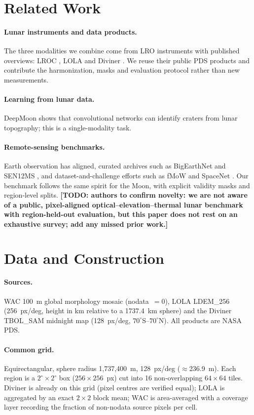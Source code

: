 \documentclass[10pt]{article}
\newcommand{\TODO}[1]{\textbf{[TODO: #1]}}
\begin{document}
\section{Related Work}
\paragraph{Lunar instruments and data products.}
The three modalities we combine come from LRO instruments with published
overviews: LROC \cite{robinson2010lroc}, LOLA \cite{smith2010lola,smith2017lola}
and Diviner \cite{paige2010diviner,williams2017diviner}. We reuse their public
PDS products and contribute the harmonization, masks and evaluation protocol
rather than new measurements.
\paragraph{Learning from lunar data.}
DeepMoon \cite{silburt2019deepmoon} shows that convolutional networks can
identify craters from lunar topography; this is a single-modality task.
\paragraph{Remote-sensing benchmarks.}
Earth observation has aligned, curated archives such as BigEarthNet
\cite{sumbul2019bigearthnet} and SEN12MS \cite{schmitt2019sen12ms}, and
dataset-and-challenge efforts such as fMoW \cite{christie2018fmow} and SpaceNet
\cite{vanetten2018spacenet}. Our benchmark follows the same spirit for the
Moon, with explicit validity masks and region-level splits.
\TODO{authors to confirm novelty: we are not aware of a public, pixel-aligned
optical--elevation--thermal lunar benchmark with region-held-out evaluation,
but this paper does not rest on an exhaustive survey; add any missed prior work.}

\section{Data and Construction}
\paragraph{Sources.}
WAC 100~m global morphology mosaic \cite{robinson2010lroc} (nodata~$=0$), LOLA
LDEM\_256 \cite{smith2010lola} (256~px/deg, height in km relative to a
1737.4~km sphere) and the Diviner TBOL\_SAM midnight map
\cite{paige2010diviner,williams2017diviner} (128~px/deg, $70^\circ$S--$70^\circ$N).
All products are NASA PDS.
\paragraph{Common grid.}
Equirectangular, sphere radius 1{,}737{,}400~m, 128~px/deg ($\approx$236.9~m).
Each region is a $2^\circ\times2^\circ$ box ($256\times256$~px) cut into 16
non-overlapping $64\times64$ tiles. Diviner is already on this grid (pixel
centres are verified equal); LOLA is aggregated by an exact $2\times2$ block
mean; WAC is area-averaged with a coverage layer recording the fraction of
non-nodata source pixels per cell.
\end{document}
